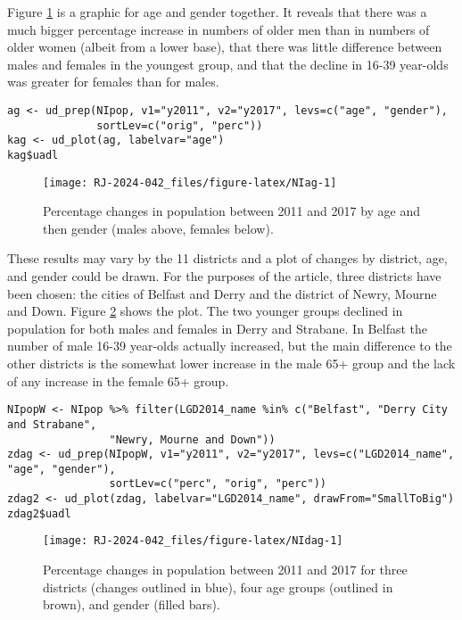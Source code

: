 Figure \ref{fig:NIag} is a graphic for age and gender together. It reveals that there was a much bigger percentage increase in numbers of older men than in numbers of older women (albeit from a lower base), that there was little difference between males and females in the youngest group, and that the decline in 16-39 year-olds was greater for females than for males.

\begin{verbatim}
ag <- ud_prep(NIpop, v1="y2011", v2="y2017", levs=c("age", "gender"),
              sortLev=c("orig", "perc"))
kag <- ud_plot(ag, labelvar="age")
kag$uadl
\end{verbatim}

\begin{figure}

{\centering \texttt{[image: RJ-2024-042\_files/figure-latex/NIag-1]} 

}

\caption{Percentage changes in population between 2011 and 2017 by age and then gender (males above, females below).}\label{fig:NIag}
\end{figure}

These results may vary by the 11 districts and a plot of changes by district, age, and gender could be drawn. For the purposes of the article, three districts have been chosen: the cities of Belfast and Derry and the district of Newry, Mourne and Down. Figure \ref{fig:NIdag} shows the plot. The two younger groups declined in population for both males and females in Derry and Strabane. In Belfast the number of male 16-39 year-olds actually increased, but the main difference to the other districts is the somewhat lower increase in the male 65+ group and the lack of any increase in the female 65+ group.

\begin{verbatim}
NIpopW <- NIpop %>% filter(LGD2014_name %in% c("Belfast", "Derry City and Strabane",
                "Newry, Mourne and Down"))
zdag <- ud_prep(NIpopW, v1="y2011", v2="y2017", levs=c("LGD2014_name", "age", "gender"),
                sortLev=c("perc", "orig", "perc"))
zdag2 <- ud_plot(zdag, labelvar="LGD2014_name", drawFrom="SmallToBig")
zdag2$uadl
\end{verbatim}

\begin{figure}

{\centering \texttt{[image: RJ-2024-042\_files/figure-latex/NIdag-1]} 

}

\caption{Percentage changes in population between 2011 and 2017 for three districts (changes outlined in blue), four age groups (outlined in brown), and gender (filled bars).}\label{fig:NIdag}
\end{figure}

